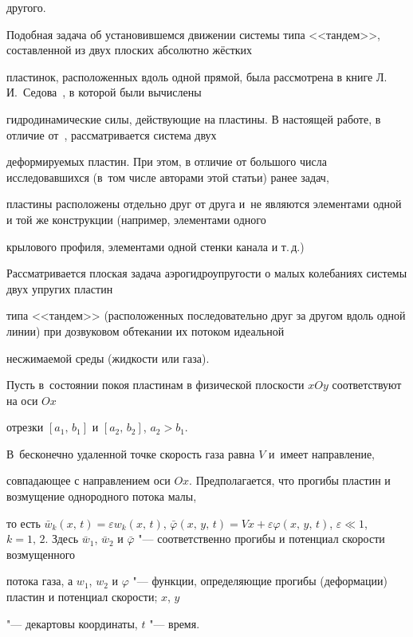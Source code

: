другого.



Подобная задача об установившемся движении системы типа <<тандем>>, составленной из двух  плоских абсолютно жёстких

пластинок, расположенных вдоль одной прямой, была рассмотрена в книге Л.\,И.~Седова~\cite{velmBibl1}, в которой были вычислены

гидродинамические силы, действующие на пластины. В настоящей работе, в отличие от~\cite{velmBibl1}, рассматривается система двух

деформируемых пластин. При этом, в отличие от большого числа исследовавшихся (в~том числе авторами этой статьи) ранее задач,

пластины расположены отдельно друг от друга и~не являются элементами одной и той же конструкции (например, элементами одного

крылового профиля, элементами одной стенки канала и т.\,д.)



\smallskip



 Рассматривается плоская задача аэрогидроупругости о малых колебаниях системы двух упругих пластин

типа <<тандем>> (расположенных последовательно друг за другом вдоль одной линии) при дозвуковом обтекании их потоком идеальной

несжимаемой среды (жидкости или газа). 

Пусть в~состоянии покоя пластинам в физической плоскости $xOy$ соответствуют на оси $Ox$

отрезки $[a_1,\,b_1]$ и $[a_2,\,b_2]$, $a_2>b_1$. 

В~бесконечно удаленной точке скорость газа равна $V$ и~имеет направление,

совпадающее с направлением оси $Ox$. Предполагается, что прогибы пластин и возмущение однородного потока малы, 

то есть $\bar w_k (x,\,t) = \varepsilon w_k (x,\,t)$, $\bar {\varphi} (x,\,y,\,t) = Vx + \varepsilon \varphi (x,\,y,\,t)$, $\varepsilon\ll 1$, $k =

1,\,2$. Здесь $\bar {w}_1 $, $\bar {w}_2 $ и $\bar {\varphi} $ "--- соответственно прогибы и потенциал скорости возмущенного

потока газа, а $w_1$, $w_2$ и $\varphi$ "--- функции, определяющие прогибы (деформации) пластин и потенциал скорости; $x$, $y$

"--- декартовы координаты,  $t$ "--- время.



